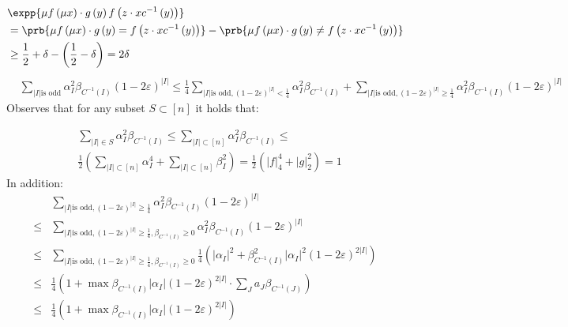 \documentclass{article}
\begin{document}
\begin{equation*}
  \begin{split}
    & \expp{\mu f\left( \mu x \right) \cdot g\left( y \right)f\left(z \cdot x c^{-1}\left( y \right)  \right)} \\ 
    & = \prb{\mu f\left( \mu x \right) \cdot g\left( y \right) = f\left(z \cdot x c^{-1}\left( y \right)  \right)} -  \prb{\mu f\left( \mu x \right) \cdot g\left( y \right) \neq f\left(z \cdot x c^{-1}\left( y \right)  \right)} \\ 
   & \ge \frac{1}{2}+\delta - \left( \frac{1}{2} - \delta \right) = 2\delta
  \end{split}
\end{equation*}
\begin{equation*}
  \begin{split}
    & \sum_{|I| \text{is odd} }{\alpha_{I}^{2}\beta_{C^{-1}(I)}  \left( 1 -2 \varepsilon \right)^{|I|}}  \le \frac{1}{4} \sum_{|I| \text{is odd}, (1-2\varepsilon)^{|I|} < \frac{1}{4}}{\alpha_{I}^{2}\beta_{C^{-1}(I)}}  + \sum_{|I| \text{is odd}, (1-2\varepsilon)^{|I|} \ge \frac{1}{4} }{\alpha_{I}^{2}\beta_{C^{-1}(I)}  \left( 1 -2 \varepsilon \right)^{|I|}}  
   \end{split}
\end{equation*}
Observes that for any subset $S \subset [n]$ it holds that: 

\begin{equation*}
  \begin{split}
    & \sum_{|I| \in S }{\alpha_{I}^{2}\beta_{C^{-1}(I)}} \le \sum_{|I| \subset [n] }{\alpha_{I}^{2}\beta_{C^{-1}(I)}} \le \\ 
    & \frac{1}{2} \left( \sum_{|I| \subset [n] }{\alpha_{I}^{4}} + \sum_{|I| \subset [n] }{\beta_{I}^{2}}   \right) = \frac{1}{2} \left(|f|_{4}^{4} + |g|_{2}^{2} \right) = 1
  \end{split}
\end{equation*}
In addition: 
\begin{equation*}
  \begin{split}
   & \sum_{|I| \text{is odd}, (1-2\varepsilon)^{|I|} \ge \frac{1}{4} }{\alpha_{I}^{2}\beta_{C^{-1}(I)}  \left( 1 -2 \varepsilon \right)^{|I|}} \\
  \le  & \sum_{|I| \text{is odd}, (1-2\varepsilon)^{|I|} \ge \frac{1}{4}, \beta_{C^{-1}(I)} \ge 0  }{\alpha_{I}^{2} \beta_{C^{-1}(I)}  \left( 1 -2 \varepsilon \right)^{|I|}} \\
  \le  &  \sum_{|I| \text{is odd}, (1-2\varepsilon)^{|I|} \ge \frac{1}{4}, \beta_{C^{-1}(I)} \ge 0  }{ \frac{1}{4}\left(|\alpha_{I}|^{2} +  \beta_{C^{-1}(I)}^{2} |\alpha_{I}|^{2}\left( 1 -2 \varepsilon \right)^{2|I|}\right) } \\ 
  \le & \frac{1}{4} \left( 1  + \max \beta_{C^{-1}(I)} |\alpha_{I}| \left( 1 - 2\varepsilon \right)^{2|I|} \cdot \sum_{J}a_{J}\beta_{C^{-1}(J)} \right) \\
  \le & \frac{1}{4} \left( 1  + \max \beta_{C^{-1}(I)} |\alpha_{I}| \left( 1 - 2\varepsilon \right)^{2|I|}  \right) \\
  \end{split}
\end{equation*}
\end{document}
